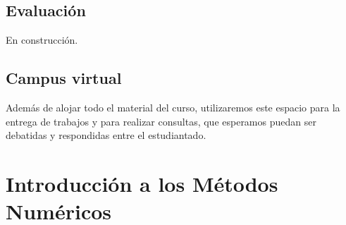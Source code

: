 \documentclass[openany]{book}
\begin{document}
\hypertarget{evaluaciuxf3n}{%
\section*{Evaluación}\label{evaluaciuxf3n}}

En construcción.

\hypertarget{campus-virtual}{%
\section*{Campus virtual}\label{campus-virtual}}

Además de alojar todo el material del curso, utilizaremos este espacio para la entrega de trabajos y para realizar consultas, que esperamos puedan ser debatidas y respondidas entre el estudiantado.

\hypertarget{introducciuxf3n-a-los-muxe9todos-numuxe9ricos}{%
\chapter{Introducción a los Métodos Numéricos}\label{introducciuxf3n-a-los-muxe9todos-numuxe9ricos}}
\end{document}
